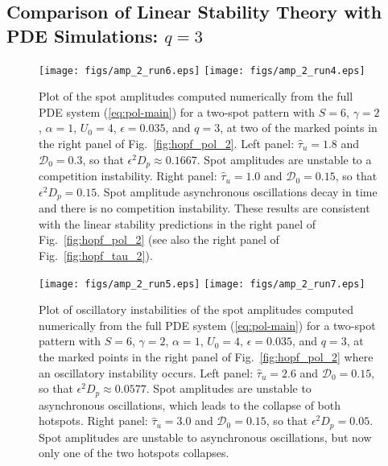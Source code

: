 \documentclass{article}%
\begin{document}
\subsection{Comparison of Linear Stability Theory with PDE Simulations: $q=3$}
\label{sec:numerics_q3}


\begin{figure}[htbp]
\centering
\texttt{[image: figs/amp\_2\_run6.eps]}
\texttt{[image: figs/amp\_2\_run4.eps]}
\caption{\label{fig:valid_2_q3_u04} Plot of the spot amplitudes
  computed numerically from the full PDE system (\ref{eq:pol-main})
  for a two-spot pattern with $S=6$, $\gamma=2$, $\alpha=1$, $U_0=4$,
  $\epsilon=0.035$, and $q=3$, at two of the marked points in the
  right panel of Fig.~\ref{fig:hopf_pol_2}.  Left panel:
  $\hat{\tau}_u=1.8$ and ${\mathcal D}_0=0.3$, so that $\epsilon^2
  D_p\approx 0.1667$. Spot amplitudes are unstable to a competition
  instability. Right panel: $\hat{\tau}_u=1.0$ and ${\mathcal D}_0=0.15$, so
  that $\epsilon^2D_p = 0.15$. Spot amplitude asynchronous
  oscillations decay in time and there is no competition instability.
  These results are consistent with the linear stability predictions
  in the right panel of Fig.~\ref{fig:hopf_pol_2} (see also the right
  panel of Fig.~\ref{fig:hopf_tau_2}).}
\end{figure}

\begin{figure}[htbp]
\centering
\texttt{[image: figs/amp\_2\_run5.eps]}
\texttt{[image: figs/amp\_2\_run7.eps]}
\caption{\label{fig:valid_2_q3_u04_b} Plot of oscillatory
  instabilities of the spot amplitudes computed numerically from the
  full PDE system (\ref{eq:pol-main}) for a two-spot pattern with
  $S=6$, $\gamma=2$, $\alpha=1$, $U_0=4$, $\epsilon=0.035$, and $q=3$,
  at the marked points in the right panel of Fig.~\ref{fig:hopf_pol_2}
  where an oscillatory instability occurs.  Left panel:
  $\hat{\tau}_u=2.6$ and ${\mathcal D}_0=0.15$, so that $\epsilon^2
  D_p\approx 0.0577$. Spot amplitudes are unstable to asynchronous
  oscillations, which leads to the collapse of both hotspots.  Right
  panel: $\hat{\tau}_u=3.0$ and ${\mathcal D}_0=0.15$, so that
  $\epsilon^2 D_p= 0.05$. Spot amplitudes are unstable to asynchronous
  oscillations, but now only one of the two hotspots collapses.}
\end{figure}
\end{document}
